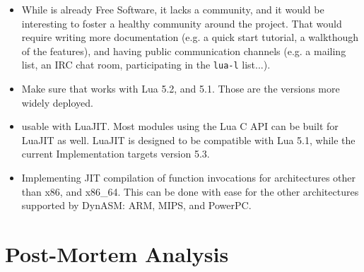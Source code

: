 \begin{itemize}

	\item While \Eol* is already Free Software, it lacks a community, and it
	would be interesting to foster a healthy community around the project.
	That would require writing more documentation (e.g. a quick start
	tutorial, a walkthough of the features), and having public communication
	channels (e.g. a mailing list, an \gls{IRC} chat room, participating in
	the \verb|lua-l| list...).

	\item Make sure that \Eol* works with Lua 5.2, and 5.1. Those are the
	versions more widely deployed.

	\item \Eol* usable with LuaJIT. Most modules using the Lua 	C API can be
	built for LuaJIT as well. LuaJIT is designed to be compatible with Lua
	5.1, while the current Implementation targets version 5.3.

	\item Implementing JIT compilation of function invocations for
	architectures other than x86, and x86\_64. This can be done with ease for
	the other architectures supported by DynASM: ARM, MIPS, and PowerPC.

\end{itemize}


\section{Post-Mortem Analysis}

